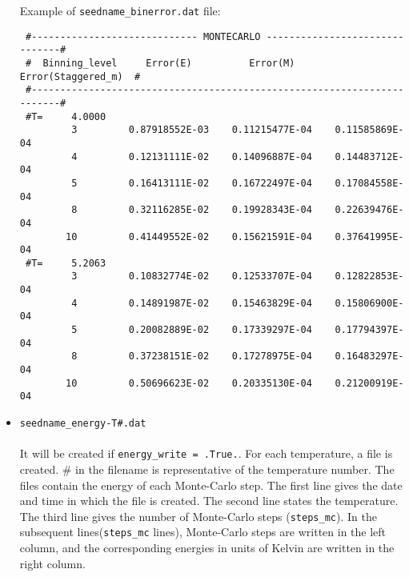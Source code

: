 \documentclass[10pt]{report}
\begin{document}
\begin{itemize}
Example of {\tt seedname\_binerror.dat}  file:
{\scriptsize    
\begin{verbatim}
 #----------------------------- MONTECARLO -------------------------------#
 #  Binning_level     Error(E)          Error(M)      Error(Staggered_m)  #
 #------------------------------------------------------------------------#
 #T=     4.0000
         3         0.87918552E-03    0.11215477E-04    0.11585869E-04
         4         0.12131111E-02    0.14096887E-04    0.14483712E-04
         5         0.16413111E-02    0.16722497E-04    0.17084558E-04
         8         0.32116285E-02    0.19928343E-04    0.22639476E-04
        10         0.41449552E-02    0.15621591E-04    0.37641995E-04
 #T=     5.2063
         3         0.10832774E-02    0.12533707E-04    0.12822853E-04
         4         0.14891987E-02    0.15463829E-04    0.15806900E-04
         5         0.20082889E-02    0.17339297E-04    0.17794397E-04
         8         0.37238151E-02    0.17278975E-04    0.16483297E-04
        10         0.50696623E-02    0.20335130E-04    0.21200919E-04
\end{verbatim}
}
\item {\tt seedname\_energy-T\#.dat}\\\\
It will be created if {\tt energy\_write = .True.}. For each temperature, a file is created. \# 
in the filename is representative of the temperature number. 
The files contain the energy of each Monte-Carlo step. The first line gives the
date and time in which the file is created. The second line states the temperature.
The third line gives the number of Monte-Carlo steps ({\tt steps\_mc}). 
In the subsequent lines({\tt steps\_mc} lines), 
Monte-Carlo steps are written in the left column, and the
 corresponding energies in units of Kelvin are written in the right column.\\


\end{itemize}
\end{document}

